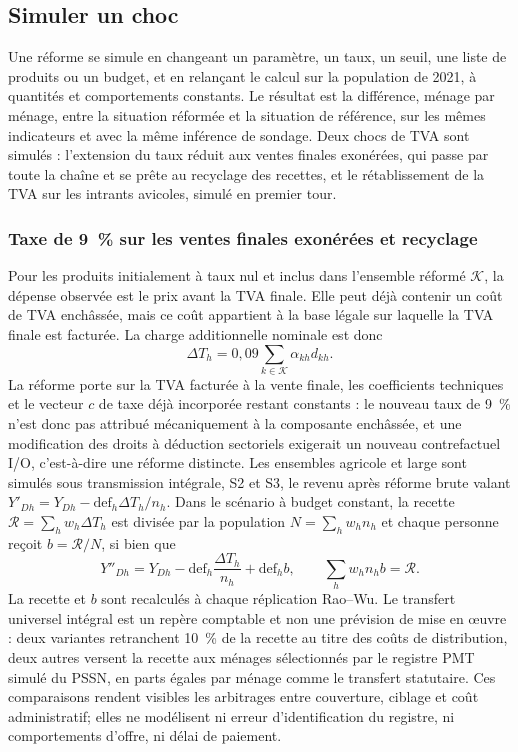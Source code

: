 \documentclass[11pt,a4paper]{article}
\begin{document}
\subsection{Simuler un choc}
\label{sec:choc}

Une réforme se simule en changeant un paramètre, un taux, un seuil, une liste
de produits ou un budget, et en relançant le calcul sur la population de 2021,
à quantités et comportements constants. Le résultat est la différence, ménage
par ménage, entre la situation réformée et la situation de référence, sur les
mêmes indicateurs et avec la même inférence de sondage. Deux chocs de TVA sont
simulés : l'extension du taux réduit aux ventes finales exonérées, qui passe par
toute la chaîne et se prête au recyclage des recettes, et le rétablissement de
la TVA sur les intrants avicoles, simulé en premier tour.

\subsubsection{Taxe de 9~\% sur les ventes finales exonérées et recyclage}

Pour les produits initialement à taux nul et inclus dans l'ensemble réformé
$\mathcal K$, la dépense observée est le prix avant la TVA finale. Elle peut déjà
contenir un coût de TVA enchâssée, mais ce coût appartient à la base légale sur
laquelle la TVA finale est facturée. La charge additionnelle nominale est donc
\begin{equation}
\Delta T_h=0,09\sum_{k\in\mathcal K}\alpha_{kh}d_{kh}.
\label{eq:reform-tax}
\end{equation}
La réforme porte sur la TVA facturée à la vente finale, les coefficients
techniques et le vecteur $c$ de taxe déjà incorporée restant constants : le
nouveau taux de 9~\% n'est donc pas attribué mécaniquement à la composante
enchâssée, et une modification des droits à déduction sectoriels exigerait un
nouveau contrefactuel I/O, c'est-à-dire une réforme distincte. Les ensembles
agricole et large sont simulés sous transmission intégrale, S2 et S3, le revenu
après réforme brute valant
$Y'_{Dh}=Y_{Dh}-\mathrm{def}_h\Delta T_h/n_h$. Dans le scénario à budget
constant, la recette $\mathcal R=\sum_hw_h\Delta T_h$ est divisée par la
population $N=\sum_hw_hn_h$ et chaque personne reçoit $b=\mathcal R/N$, si bien
que
\begin{equation}
Y''_{Dh}=Y_{Dh}-\mathrm{def}_h\frac{\Delta T_h}{n_h}
          +\mathrm{def}_h b,\qquad
\sum_hw_hn_hb=\mathcal R.
\label{eq:recycling}
\end{equation}
La recette et $b$ sont recalculés à chaque réplication Rao--Wu. Le transfert
universel intégral est un repère comptable et non une prévision de mise en
\oe{}uvre : deux variantes retranchent 10~\% de la recette au titre des coûts de
distribution, deux autres versent la recette aux ménages sélectionnés par le
registre PMT simulé du PSSN, en parts égales par ménage comme le transfert
statutaire. Ces comparaisons rendent visibles les arbitrages entre couverture,
ciblage et coût administratif; elles ne modélisent ni erreur d'identification du
registre, ni comportements d'offre, ni délai de paiement.
\end{document}
